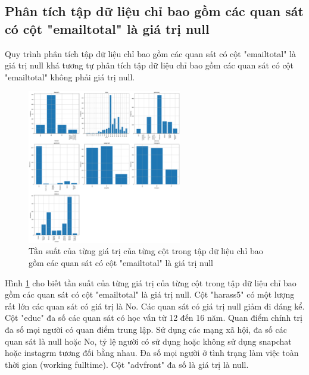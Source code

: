 \subsection{Phân tích tập dữ liệu chỉ bao gồm các quan sát có cột "emailtotal" là giá trị null}

Quy trình phân tích tập dữ liệu chỉ bao gồm các quan sát có cột "emailtotal" là giá trị null khá tương tự phân tích tập dữ liệu chỉ bao gồm các quan sát có cột "emailtotal" không phải giá trị null.

\begin{figure}[H]
    \centering
    \includegraphics[width=0.6\textwidth]{figures/Thanh/Data_Analysis/With_null_frequency_of_unique_values_of_columns.png}
    \caption{Tần suất của từng giá trị của từng cột trong tập dữ liệu chỉ bao gồm các quan sát có cột "emailtotal" là giá trị null}
    \label{fig:With_null_frequency_of_unique_values_of_columns}
\end{figure}

Hình \ref{fig:With_null_frequency_of_unique_values_of_columns} cho biết tần suất của từng giá trị của từng cột trong tập dữ liệu chỉ bao gồm các quan sát có cột "emailtotal" là giá trị null.
Cột "harass5" có một lượng rất lớn các quan sát có giá trị là No.
Các quan sát có giá trị null giảm đi đáng kể.
Cột "educ" đa số các quan sát có học vấn từ 12 đến 16 năm.
Quan điểm chính trị đa số mọi người có quan điểm trung lập.
Sử dụng các mạng xã hội, đa số các quan sát là null hoặc No, tỷ lệ người có sử dụng hoặc không sử dụng snapchat hoặc instagrm tương đối bằng nhau.
Đa số mọi người ở tình trạng làm việc toàn thời gian (working fulltime).
Cột "advfront" đa số là giá trị là null.

